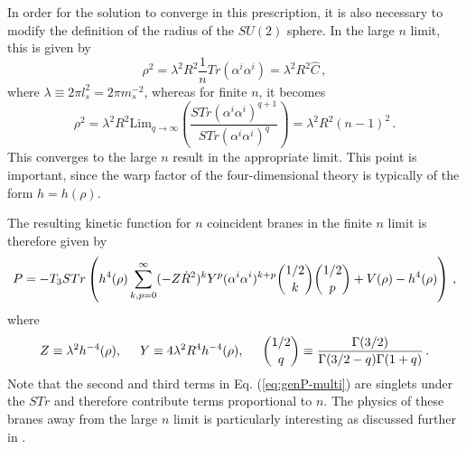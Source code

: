 In order for the solution to converge in this prescription, 
it is also necessary to modify the definition of the radius of the 
$SU(2)$ sphere. In the large $n$ limit, this is given by
% 
\begin{equation}
\rho^2 = \lambda^2 R^2 \frac{1}{n} Tr(\alpha^i \alpha^i) = \lambda^2 R^2
\hat{C} \,,
\end{equation}
% 
where $\lambda \equiv 2\pi l_s^2 = 2\pi m_s^{-2}$, 
whereas for finite $n$, it becomes
% 
\begin{equation}
\rho^2 = \lambda^2 R^2 \mathrm{Lim}_{q \to \infty} \left(\frac{STr (\alpha^i
\alpha^i)^{q+1}}{STr(\alpha^i \alpha^i)^q} \right) 
= \lambda^2 R^2 (n-1)^2 \,.
\end{equation}
% 
This converges to the large $n$ result in the appropriate limit.
This point is important, since the warp factor 
of the four-dimensional theory is typically of the form $h= h(\rho)$.


The resulting kinetic function for $n$ coincident branes in 
the finite $n$ limit is therefore given by
% 
\begin{equation}
\label{eq:genP-multi}
P = -T_3 STr \left(h^4(\rho) \sum_{k,p=0}^{\infty}(-Z\dot{R}^2)^k Y^p (\alpha^i
\alpha^i)^{k+p}{1/2 \choose k} {1/2 \choose p} + V(\rho)
-
h^4(\rho) \right) \,,
\end{equation}
% 
where 
% 
\begin{equation}
Z \equiv \lambda^2 h^{-4}(\rho), \hspace{0.5cm} Y \equiv 4\lambda^2 R^4
h^{-4}(\rho),
\hspace{0.5cm} {1/2 \choose q}
\equiv \frac{\Gamma(3/2)}{\Gamma(3/2-q)\Gamma(1+q)} \,.
\end{equation}
% 
Note that the second and third terms in Eq. (\ref{eq:genP-multi}) 
are singlets under the $STr$ and therefore contribute terms proportional 
to $n$. The physics of these branes away from the large $n$ limit is particularly interesting as
discussed further
in \cite{thomasward, Ward:2007gs}.


